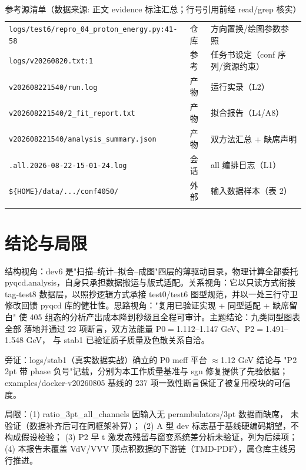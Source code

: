 \documentclass[UTF8]{ctexart}
\begin{document}
\begin{xltabular}{\textwidth}{llX}
\texttt{\nolinkurl{logs/test6/repro\_04\_proton\_energy.py:41-58}} & 仓库 & 方向置换/绘图参数参照 \\
\texttt{\nolinkurl{logs/v20260820.txt:1}} & 参考 & 任务书设定（conf 序列/资源约束）\\
\texttt{\nolinkurl{v202608221540/run.log}} & 产物 & 运行实录（L2）\\
\texttt{\nolinkurl{v202608221540/2\_fit\_report.txt}} & 产物 & 拟合报告（L4/A8）\\
\texttt{\nolinkurl{v202608221540/analysis\_summary.json}} & 产物 & 双方法汇总 + 缺席声明 \\
\texttt{\nolinkurl{.all.2026-08-22-15-01-24.log}} & 会话 & all 编排日志（L1）\\
\texttt{\nolinkurl{\${HOME}/data/.../conf4050/}} & 外部 & 输入数据样本（表 2）\\
\bottomrule
\caption{参考源清单（数据来源: 正文 evidence 标注汇总；行号引用前经 read/grep 核实）}
\end{xltabular}

\section{结论与局限}
\begin{conclbox}
结构视角：dev6 是"扫描--统计--拟合--成图"四层的薄驱动目录，物理计算全部委托
pyqcd.analysis，自身只承担数据搬运与版式适配。关系视角：它以只读方式衔接
tag-test8 数据层，以照抄逻辑方式承接 test0/test6 图型规范，并以一处三行守卫
修改回馈 pyqcd 库的健壮性。思路视角："复用已验证实现 + 同型适配 + 缺席留白"
使 405 组态的分析产出成本降到秒级且全程可审计。主题结论：九类同型图表全部
落地并通过 22 项断言，双方法能量 P0$=$1.112--1.147 GeV、P2$=$1.491--1.548 GeV，
与 stab1 已验证质子质量及色散关系自洽。
\end{conclbox}
\begin{refbox}
旁证：logs/stab1（真实数据实战）确立的 P0 meff 平台 $\approx$1.12 GeV 结论与
"P2 2pt 带 phase 负号"记载，分别为本工作质量基准与 sgn 修复提供了先验依据；
examples/docker-v20260805 基线的 237 项一致性断言保证了被复用模块的可信度。
\end{refbox}
\begin{warnbox}
局限：(1) ratio\_3pt\_all\_channels 因输入无 perambulators/3pt 数据而缺席，
\textcolor{warn}{未验证}（数据补齐后可在同框架补算）；
(2) A 型 dev 标志基于基线硬编码期望，\textcolor{warn}{不构成假设检验}；
(3) P2 早 t 激发态残留与窗变系统差分析\textcolor{warn}{未验证}，列为后续项；
(4) 本报告未覆盖 VdV/VVV 顶点积数据的下游链（TMD-PDF），属仓库主线另行推进。
\end{warnbox}
\end{document}

